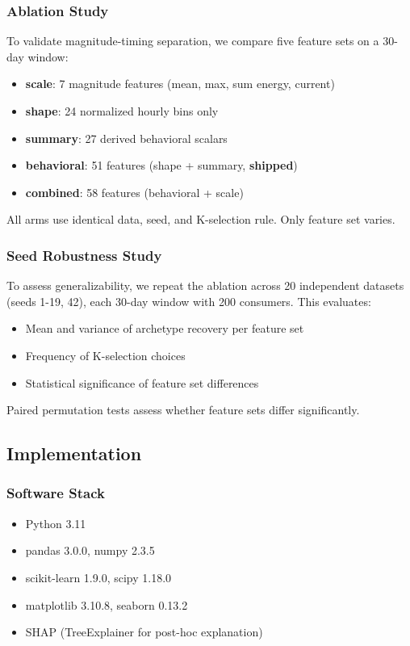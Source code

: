 \subsubsection{Ablation Study}

To validate magnitude-timing separation, we compare five feature sets on a 30-day window:
\begin{itemize}
    \item \textbf{scale}: 7 magnitude features (mean, max, sum energy, current)
    \item \textbf{shape}: 24 normalized hourly bins only
    \item \textbf{summary}: 27 derived behavioral scalars
    \item \textbf{behavioral}: 51 features (shape + summary, \textbf{shipped})
    \item \textbf{combined}: 58 features (behavioral + scale)
\end{itemize}

All arms use identical data, seed, and K-selection rule. Only feature set varies.

\subsubsection{Seed Robustness Study}

To assess generalizability, we repeat the ablation across 20 independent datasets (seeds 1-19, 42), each 30-day window with 200 consumers. This evaluates:
\begin{itemize}
    \item Mean and variance of archetype recovery per feature set
    \item Frequency of K-selection choices
    \item Statistical significance of feature set differences
\end{itemize}

Paired permutation tests assess whether feature sets differ significantly.

\subsection{Implementation}

\subsubsection{Software Stack}

\begin{itemize}
    \item Python 3.11
    \item pandas 3.0.0, numpy 2.3.5
    \item scikit-learn 1.9.0, scipy 1.18.0
    \item matplotlib 3.10.8, seaborn 0.13.2
    \item SHAP (TreeExplainer for post-hoc explanation)
\end{itemize}

